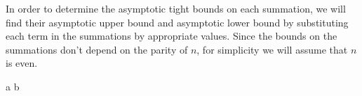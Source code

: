 In order to determine the asymptotic tight bounds on each summation, we will find their asymptotic upper bound and asymptotic lower bound by substituting each term in the summations by appropriate values.
Since the bounds on the summations don't depend on the parity of $n$, for simplicity we will assume that $n$ is even.

{a}
{b}

